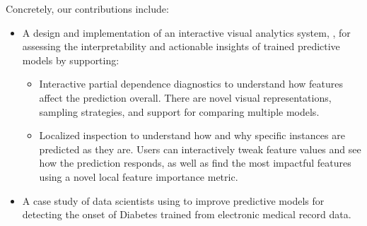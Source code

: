 Concretely, our contributions include:

\begin{itemize}
\item A design and implementation of an interactive visual analytics system,
\prospector, for assessing the interpretability and actionable insights of trained predictive models by supporting:
\begin{itemize}
    \item Interactive partial dependence diagnostics to understand how features affect the prediction overall. There are novel visual representations, sampling strategies, and support for comparing multiple models.
    \item Localized inspection to understand how and why specific instances are predicted as they are.  Users can interactively tweak feature values and see how the prediction responds, as well as find the most impactful features using a novel local feature importance metric.
  \end{itemize}
\item A case study of data scientists using
\prospector to improve predictive models for detecting the onset of Diabetes trained from electronic medical record data.
\end{itemize}


